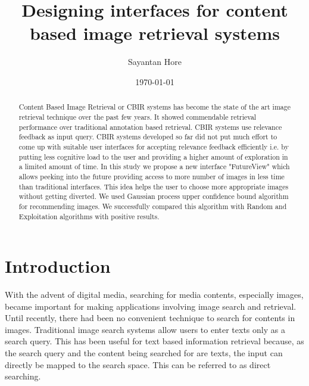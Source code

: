 \documentclass[english]{tktltiki}
\begin{document}
\onehalfspacing

\title{Designing interfaces for content based image retrieval systems}
\author{Sayantan Hore}
\date{\today}

\maketitle



\begin{abstract}

Content Based Image Retrieval or CBIR systems has become the state of the art image retrieval technique over the past few years. It showed commendable retrieval performance over traditional annotation based retrieval. CBIR systems use relevance feedback as input query. CBIR systems developed so far did not put much effort to come up with suitable user interfaces for accepting relevance feedback efficiently i.e. by putting less cognitive load to the user and providing a higher amount of exploration in a limited amount of time. In this study we propose a new interface "FutureView" which allows peeking into the future providing access to more number of images in less time than traditional interfaces. This idea helps the user to choose more appropriate images without getting diverted. We used Gaussian process upper confidence bound algorithm for recommending images. We successfully compared this algorithm with Random and Exploitation algorithms with positive results.

\end{abstract}

\mytableofcontents




\section{Introduction}

With the advent of digital media, searching for media contents, especially images, became important for making applications involving image search and retrieval. Until recently, there had been no convenient technique to search for contents in images. Traditional image search systems allow users to enter texts only as a search query. This has been useful for text based information retrieval because, as the search query and the content being searched for are texts, the input can directly be mapped to the search space. This can be referred to as direct searching.
\end{document}
